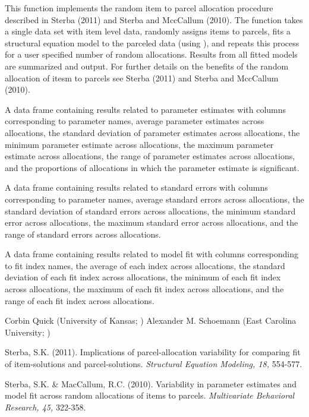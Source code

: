 \documentclass[a4paper]{book}
\begin{document}
%
\begin{Details}\relax
This function implements the random item to parcel allocation procedure described in Sterba (2011) and Sterba and MccCallum (2010). The function takes a single data set with item level data, randomly assigns items to parcels, fits a structural equation model to the parceled data (using ), and repeats this process for a user specified number of random allocations. Results from all fitted models are summarized and output. For further details on the benefits of the random allocation of itesm to parcels see Sterba (2011) and Sterba and MccCallum (2010). 
\end{Details}
%
\begin{Value}
\begin{ldescription}
\item[\code{Estimates}] A data frame containing results related to parameter estimates with columns corresponding to parameter names, average parameter estimates across allocations, the standard deviation of parameter estimates across allocations, the minimum parameter estimate across allocations, the maximum parameter estimate across allocations, the range of parameter estimates across allocations, and the proportions of allocations in which the parameter estimate is significant.
\item[\code{SE}] A data frame containing results related to standard errors with columns corresponding to parameter names, average standard errors across allocations, the standard deviation of standard errors across allocations, the minimum standard error across allocations, the maximum standard error across allocations, and the range of standard errors across allocations.
\item[\code{Fit}] A data frame containing results related to model fit with columns corresponding to fit index names, the average of each index across allocations, the standard deviation of each fit index across allocations, the minimum of each fit index across allocations, the maximum of each fit index across allocations, and the range of each fit index across allocations.
\end{ldescription}
\end{Value}
%
\begin{Author}\relax
Corbin Quick (University of Kansas; )
Alexander M. Schoemann (East Carolina University; )
\end{Author}
%
\begin{References}\relax
Sterba, S.K. (2011). Implications of parcel-allocation variability for comparing fit of item-solutions and parcel-solutions. \emph{Structural Equation Modeling, 18,} 554-577.

Sterba, S.K. \& MacCallum, R.C. (2010). Variability in parameter estimates and model fit across random allocations of items to parcels. \emph{Multivariate Behavioral Research, 45,} 322-358.
\end{References}
\end{document}
